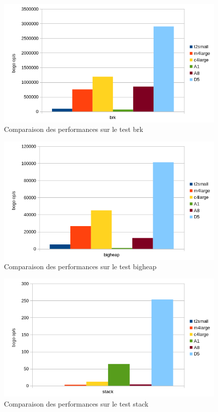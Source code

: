 \documentclass[11pt]{article}
\begin{document}
	\begin{figure}[htbp]
	\begin{center}
	\includegraphics[scale=0.9]{images/brk.png} 
	\caption{Comparaison des performances sur le test brk}
	\label{fig:fig0}
	\end{center}
	\end{figure}
	\begin{figure}[htbp]
	\begin{center}
	\includegraphics[scale=0.9]{images/bigheap.png} 
	\caption{Comparaison des performances sur le test bigheap}
	\label{fig:fig0}
	\end{center}
	\end{figure}
	\begin{figure}[htbp]
	\begin{center}
	\includegraphics[scale=0.9]{images/stack.png} 
	\caption{Comparaison des performances sur le test stack}
	\label{fig:fig0}
	\end{center}
	\end{figure}
\end{document}
